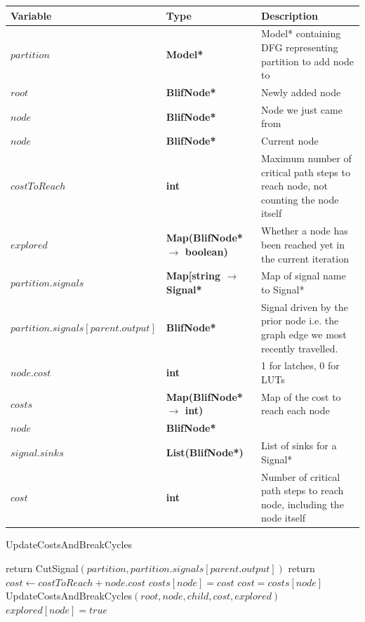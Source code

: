 \documentclass[12pt,final,oneside]{article} %
\begin{document}
\begin{algorithm}
    \begin{center}
        \begin{tabularx}{\linewidth}{llX}
        \toprule
        Variable & Type & Description\\
        \midrule
        $partition$ &\bf  Model* & Model* containing DFG representing partition to add node to\\
        $root$ &\bf  BlifNode* & Newly added node\\
        $node$ &\bf  BlifNode* & Node we just came from\\
        $node$ &\bf  BlifNode* & Current node\\
        $costToReach$ &\bf  int & Maximum number of critical path steps to reach node, not counting the node itself \\
        $explored$ &\bf  Map(BlifNode* $\to$ boolean) & Whether a node has been reached yet in the current iteration \\ 
        $partition.signals$ &\bf  Map[string $\to$ Signal* & Map of signal name to Signal* \\
        $partition.signals[parent.output]$ &\bf  BlifNode* & Signal driven by the prior node i.e. the graph edge we most recently travelled. \\
        $node.cost$ &\bf  int & 1 for latches, 0 for LUTs \\
        $costs$ &\bf  Map(BlifNode* $\to$ int) & Map of the cost to reach each node \\
        $node$ &\bf  BlifNode* & \\
        $signal.sinks$ &\bf  List(BlifNode*) & List of sinks for a Signal* \\
        $cost$ &\bf  int & Number of critical path steps to reach node, including the node itself \\
        \bottomrule
        \end{tabularx}
    \end{center}
   \caption{UpdateCostsAndBreakCycles}\label{updatecosts}
   \begin{algorithmic}[1]
       
            \State return
         \EndIf
          
            \State CutSignal$(partition, partition.signals[parent.output])$
            \State return
         \EndIf
         \State $cost \gets costToReach+node.cost$
            \State $costs[node] = cost$
         \Else
            \State $cost = costs[node]$
         \EndIf
            \State UpdateCostsAndBreakCycles$(root, node, child, cost, explored)$
         \EndFor
         \State $explored[node] = true$
      \EndProcedure
   \end{algorithmic}
\end{algorithm}
\end{document}

